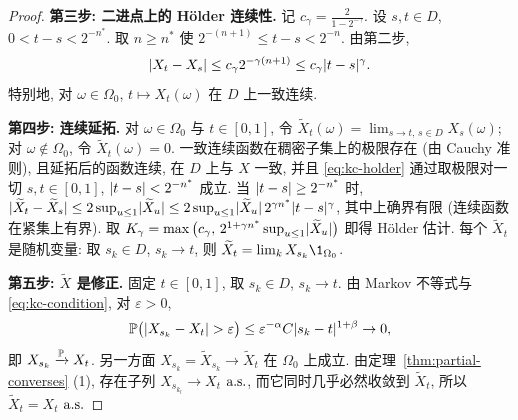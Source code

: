 \begin{proof}
\textbf{第三步: 二进点上的 H\"older 连续性.} 记 $c_\gamma=\frac{2}{1-2^{-\gamma}}$. 设 $s,t\in D$, $0<t-s<2^{-n^*}$. 取 $n\ge n^*$ 使 $2^{-(n+1)}\le t-s<2^{-n}$. 由第二步,
\begin{equation}\label{eq:kc-holder}
\abs{X_t-X_s}\le c_\gamma2^{-\gamma(n+1)}\le c_\gamma\abs{t-s}^\gamma.
\end{equation}
特别地, 对 $\omega\in\Omega_0$, $t\mapsto X_t(\omega)$ 在 $D$ 上一致连续.

\textbf{第四步: 连续延拓.} 对 $\omega\in\Omega_0$ 与 $t\in[0,1]$, 令 $\widetilde{X}_t(\omega)=\lim_{s\to t,\,s\in D}X_s(\omega)$; 对 $\omega\notin\Omega_0$, 令 $\widetilde{X}_t(\omega)=0$. 一致连续函数在稠密子集上的极限存在 (由 Cauchy 准则), 且延拓后的函数连续, 在 $D$ 上与 $X$ 一致, 并且 \eqref{eq:kc-holder} 通过取极限对一切 $s,t\in[0,1]$, $\abs{t-s}<2^{-n^*}$ 成立. 当 $\abs{t-s}\ge2^{-n^*}$ 时, $\abs{\widetilde{X}_t-\widetilde{X}_s}\le2\sup_{u\le1}\abs{\widetilde{X}_u}\le2\sup_{u\le1}\abs{\widetilde{X}_u}\,2^{\gamma n^*}\abs{t-s}^\gamma$, 其中上确界有限 (连续函数在紧集上有界). 取 $K_\gamma=\max\big(c_\gamma,\,2^{1+\gamma n^*}\sup_{u\le1}\abs{\widetilde{X}_u}\big)$ 即得 H\"older 估计. 每个 $\widetilde{X}_t$ 是随机变量: 取 $s_k\in D$, $s_k\to t$, 则 $\widetilde{X}_t=\lim_kX_{s_k}\1_{\Omega_0}$.

\textbf{第五步: $\widetilde{X}$ 是修正.} 固定 $t\in[0,1]$, 取 $s_k\in D$, $s_k\to t$. 由 Markov 不等式与 \eqref{eq:kc-condition}, 对 $\varepsilon>0$,
\[
\P\big(\abs{X_{s_k}-X_t}>\varepsilon\big)\le\varepsilon^{-\alpha}C\abs{s_k-t}^{1+\beta}\to0,
\]
即 $X_{s_k}\xrightarrow{\P}X_t$. 另一方面 $X_{s_k}=\widetilde{X}_{s_k}\to\widetilde{X}_t$ 在 $\Omega_0$ 上成立. 由定理~\ref{thm:partial-converses} (1), 存在子列 $X_{s_{k_l}}\to X_t$ $\as$, 而它同时几乎必然收敛到 $\widetilde{X}_t$, 所以 $\widetilde{X}_t=X_t$ $\as$
\end{proof}

